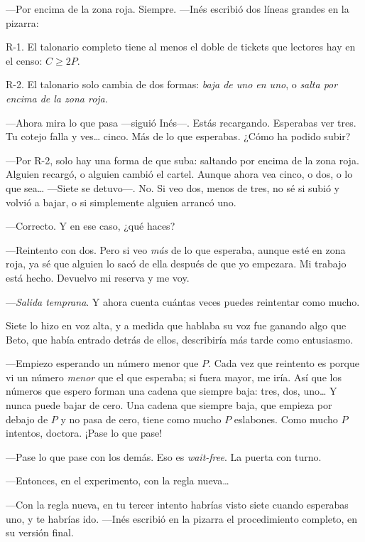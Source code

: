 ---Por encima de la zona roja. Siempre. ---Inés escribió dos líneas grandes en la pizarra:

\begin{pizarra}
\textsc{R-1.} El talonario completo tiene al menos el doble de tickets que lectores hay en el censo: $C \geq 2P$.

\smallskip
\textsc{R-2.} El talonario solo cambia de dos formas: \emph{baja de uno en uno}, o \emph{salta por encima de la zona roja}.
\end{pizarra}

---Ahora mira lo que pasa ---siguió Inés---\nobreak. Estás recargando. Esperabas ver tres. Tu cotejo falla y ves\ldots{} cinco. Más de lo que esperabas. ¿Cómo ha podido subir?

---Por R-2, solo hay una forma de que suba: saltando por encima de la zona roja. Alguien recargó, o alguien cambió el cartel. Aunque ahora vea cinco, o dos, o lo que sea\ldots{} ---Siete se detuvo---\nobreak. No. Si veo dos, menos de tres, no sé si subió y volvió a bajar, o si simplemente alguien arrancó uno.

---Correcto. Y en ese caso, ¿qué haces?

---Reintento con dos. Pero si veo \emph{más} de lo que esperaba, aunque esté en zona roja, ya sé que alguien lo sacó de ella después de que yo empezara. Mi trabajo está hecho. Devuelvo mi reserva y me voy.

---\emph{Salida temprana}. Y ahora cuenta cuántas veces puedes reintentar como mucho.

Siete lo hizo en voz alta, y a medida que hablaba su voz fue ganando algo que Beto, que había entrado detrás de ellos, describiría más tarde como entusiasmo.

---Empiezo esperando un número menor que $P$. Cada vez que reintento es porque vi un número \emph{menor} que el que esperaba; si fuera mayor, me iría. Así que los números que espero forman una cadena que siempre baja: tres, dos, uno\ldots{} Y nunca puede bajar de cero. Una cadena que siempre baja, que empieza por debajo de $P$ y no pasa de cero, tiene como mucho $P$ eslabones. Como mucho $P$ intentos, doctora. ¡Pase lo que pase!

---Pase lo que pase con los demás. Eso es \emph{wait-free}. La puerta con turno.

---Entonces, en el experimento, con la regla nueva\ldots

---Con la regla nueva, en tu tercer intento habrías visto siete cuando esperabas uno, y te habrías ido. ---Inés escribió en la pizarra el procedimiento completo, en su versión final.

